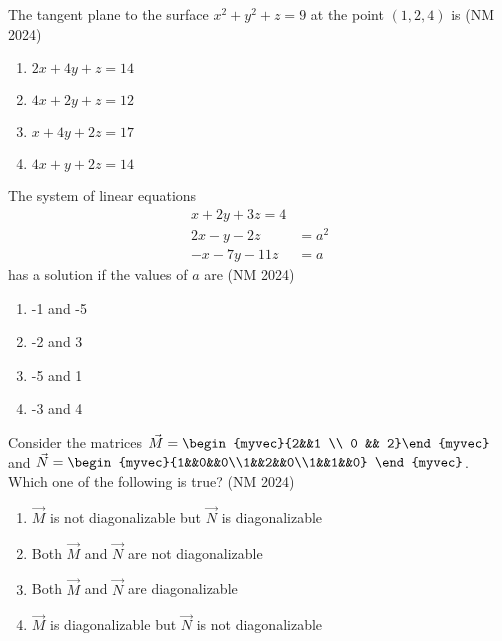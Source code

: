 \item The tangent plane to the surface $x^2 + y^2 + z = 9$ at the point $(1, 2, 4)$ is
\hfill	(NM 2024)
\begin{multicols}{4}
\begin{enumerate}
        \item $2x+4y+z=14$
        \item $4x+2y+z=12$
        \item $x+4y+2z=17$
        \item $4x+y+2z=14$
\end{enumerate}
\end{multicols}
\item The system of linear equations 
	\begin{align*}
x + 2y + 3z = 4
\\
2x - y - 2z &= a^2
\\
- x - 7y - 11z &= a
\end{align*}
has a solution if the values of $a$ are
\hfill	(NM 2024)
\begin{multicols}{4}
\begin{enumerate}
        \item -1 and -5
        \item -2 and 3
        \item -5 and 1
        \item -3 and 4
\end{enumerate}
\end{multicols}
    \item Consider the matrices $\vec{M}=\begin{myvec}{2&&1 \\ 0 && 2}\end{myvec}$ and $\vec{N}=\begin{myvec}{1&&0&&0\\1&&2&&0\\1&&1&&0} \end{myvec}$. Which one of the following is true?
\hfill	(NM 2024)
\begin{enumerate}
       \item $\vec{M}$ is not diagonalizable but $\vec{N}$ is diagonalizable 
       \item Both $\vec{M}$ and $\vec{N}$ are not diagonalizable
       \item Both $\vec{M}$ and $\vec{N}$ are diagonalizable   
       \item $\vec{M}$ is diagonalizable but $\vec{N}$ is not diagonalizable 
\end{enumerate}
